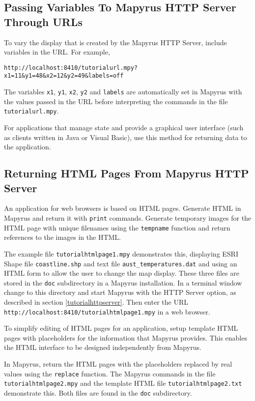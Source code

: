 \subsection{Passing Variables To Mapyrus HTTP Server Through URLs}

To vary the display that is created by the Mapyrus HTTP Server, include
variables in the URL.  For example,

\begin{verbatim}
http://localhost:8410/tutorialurl.mpy?x1=11&y1=48&x2=12&y2=49&labels=off
\end{verbatim}

The variables \texttt{x1}, \texttt{y1}, \texttt{x2}, \texttt{y2}
and \texttt{labels} are automatically set in Mapyrus with the values
passed in the URL before interpreting
the commands in the file \texttt{tutorialurl.mpy}.

For applications that manage state
and provide a graphical user interface (such as clients written in
Java or Visual Basic), use this method for returning data to the
application.

\subsection{Returning HTML Pages From Mapyrus HTTP Server}

An application for web browsers is based on HTML pages.
Generate HTML in Mapyrus and return it with \texttt{print} commands.
Generate temporary images for the HTML page with
unique filenames using the
\texttt{tempname}
function and return references to the images in the HTML.

The example file \texttt{tutorialhtmlpage1.mpy} demonstrates
this, displaying ESRI Shape file
\texttt{coastline.shp}
and text file
\texttt{aust\_temperatures.dat}
and using an HTML form to allow
the user to change the map display.
These three files are stored in the \texttt{doc} subdirectory
in a Mapyrus installation.
In a terminal window change to this directory and
start Mapyrus with the HTTP Server option, as described in section
\ref{tutorialhttpserver}.
Then enter the URL
\texttt{http://localhost:8410/tutorialhtmlpage1.mpy}
in a web browser.

To simplify editing of HTML pages for an application, setup
template HTML pages with placeholders for the information that
Mapyrus provides.  This enables the HTML interface to be designed
independently from Mapyrus.

In Mapyrus, return the HTML pages with the placeholders
replaced by real values using the
\texttt{replace}
function.  The Mapyrus commands in the file \texttt{tutorialhtmlpage2.mpy}
and the template HTML file \texttt{tutorialhtmlpage2.txt}
demonstrate this.  Both files are found in the
\texttt{doc} subdirectory.

